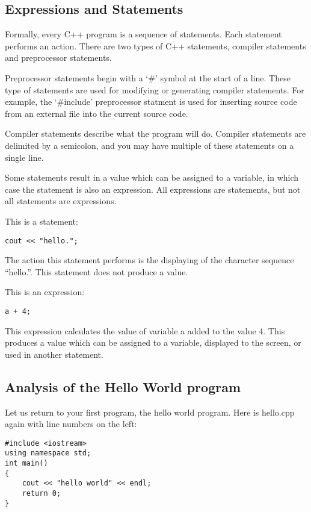 \documentclass[a4paper,12pt]{article}
\begin{document}
\subsection*{Expressions and Statements}

Formally, every C++ program is a sequence of statements. Each statement performs an action. There are two types of C++ statements, compiler statements and preprocessor statements. 

Preprocessor statements begin with a `\#' symbol at the start of a line. These type of statements are used for modifying or generating compiler statements. For example, the `\#include' preprocessor statment is used for inserting source code from an external file into the current source code. 

Compiler statements describe what the program will do. Compiler statements are delimited by a semicolon, and you may have multiple of these statements on a single line.

Some statements result in a value which can be assigned to a variable, in which case the statement is also an expression. All expressions are statements, but not all statements are expressions. 

This is a statement: 

\begin{lstlisting}
cout << "hello.";
\end{lstlisting}

The action this statement performs is the displaying of the character sequence ``hello.''. This statement does not produce a value.

This is an expression:

\begin{lstlisting}
a + 4;
\end{lstlisting}

This expression calculates the value of variable a added to the value 4. This produces a value which can be assigned to a variable, displayed to the screen, or used in another statement. 

\subsection*{Analysis of the Hello World program}

Let us return to your first program, the hello world program. Here is hello.cpp again with line numbers on the left:

\lstset{numbers=left}
\begin{lstlisting}
#include <iostream>
using namespace std;
int main()
{
	cout << "hello world" << endl;
	return 0;
}
\end{lstlisting}
\end{document}
